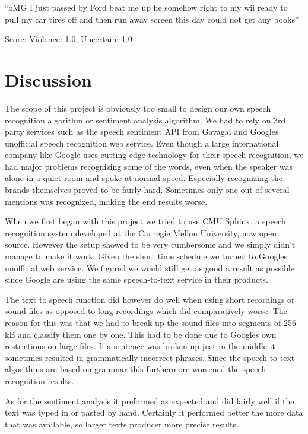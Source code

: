 \documentclass[a4paper,12pt,twoside]{ltxdoc}
\begin{document}
\begin{center}
``oMG I just passed by Ford beat me up he somehow right to my wii ready to pull my car tires off and then run away screen this day could not get any books''
\end{center}
\hfill Score: Violence: 1.0, Uncertain: 1.0

\section{Discussion}
The scope of this project is obviously too small to design our own speech recognition algorithm or sentiment analysis algorithm. We had to rely on 3rd party services such as the speech sentiment API from Gavagai and Googles unofficial speech recognition web service. Even though a large international company like Google uses cutting edge technology for their speech recognition, we had major problems recognizing some of the words, even when the speaker was alone in a quiet room and spoke at normal speed. Especially recognizing the brands themselves proved to be fairly hard. Sometimes only one out of several mentions was recognized, making the end results worse. 

When we first began with this project we tried to use CMU Sphinx, a speech recognition system developed at the Carnegie Mellon University, now open source. However the setup showed to be very cumbersome and we simply didn't manage to make it work. Given the short time schedule we turned to Googles unofficial web service. We figured we would still get as good a result as possible since Google are using the same speech-to-text service in their products. 

The text to speech function did however do well when using short recordings or sound files as opposed to long recordings which did comparatively worse. The reason for this was that we had to break up the sound files into segments of 256 kB and classify them one by one. This had to be done due to Googles own restrictions on large files. If a sentence was broken up just in the middle it sometimes resulted in grammatically incorrect phrases. Since the speech-to-text algorithms are based on grammar this furthermore worsened the speech recognition results.

As for the sentiment analysis it preformed as expected and did fairly well if the text was typed in or pasted by hand. Certainly it performed better the more data that was available, so larger texts producer more precise results. 
\end{document}
